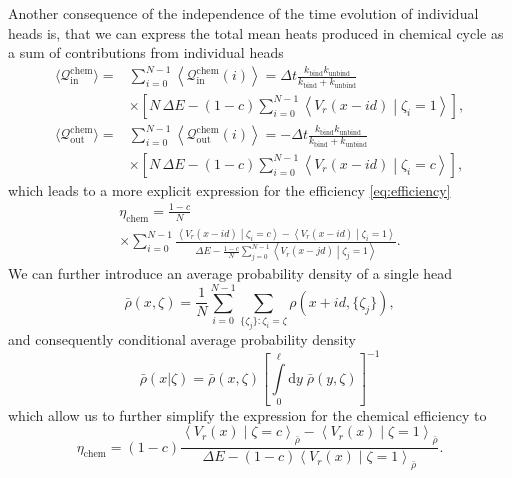 \documentclass[aps,pre,twocolumn,showpacs,showkeys,superscriptaddress,floatfix]{revtex4-1}
\newcommand{\rmd}{{\mathrm d}}
\begin{document}
Another consequence of the independence of the time evolution of individual heads is, 
that we can express the total mean heats produced in chemical cycle as a sum of contributions from individual heads
\begin{align*}
\langle \mathcal Q_\text{in}^\text{chem} \rangle 
=& \sum\limits_{i=0}^{N-1} \left\langle \mathcal Q_\text{in}^\text{chem}(i) \right\rangle 
= \Delta t \frac{ k_\text{bind} k_\text{unbind} }{ k_\text{bind} + k_\text{unbind} } 
\\ &\times
\left[ N \, \Delta E 
- (1-c) \sum\limits_{i=0}^{N-1} \left\langle V_r(x - i d ) \middle| \zeta_i = 1 \right\rangle 
\right] ,  
\\
\langle \mathcal Q^\text{chem}_\text{out} \rangle 
=& \sum\limits_{i=0}^{N-1} \left\langle \mathcal Q_\text{out}^\text{chem}(i) \right\rangle 
= - \Delta t \frac{ k_\text{bind} k_\text{unbind} }{ k_\text{bind} + k_\text{unbind} } 
\\ &\times
\left[ N \, \Delta E 
- (1-c) \sum\limits_{i=0}^{N-1} \left\langle V_r(x - i d ) \middle| \zeta_i = c \right\rangle  
\right] , 
\end{align*}
which leads to a more explicit expression for the efficiency \eqref{eq:efficiency} 
\begin{multline*}
\eta_\text{chem} = \frac{1-c}{N}
\\ \times
\sum\limits_{i=0}^{N-1} \frac{ \left\langle V_r(x-id) \middle| \zeta_i = c \right\rangle - \left\langle V_r( x -id ) \middle| \zeta_i = 1 \right\rangle }
{ \Delta E - \frac{1-c}{N} \sum\limits_{j=0}^{N-1} \left\langle V_r(x-jd) \middle| \zeta_j = 1 \right\rangle } 
. 
\end{multline*}
We can further introduce an average probability density of a single head 
\begin{equation}
\bar{\rho}(x,\zeta) = \frac{1}{N} \sum\limits_{i=0}^{N-1} \sum\limits_{ \{ \zeta_j \} : \zeta_i = \zeta } \rho( x + i d, \{ \zeta_j \} ) ,
\label{eq:eff_distribution}
\end{equation}
and consequently conditional average probability density
\begin{equation}
\bar{\rho}(x|\zeta) = \bar{\rho}(x,\zeta) \left[ \int\limits_0^\ell \rmd y \; \bar{\rho}(y,\zeta) \right]^{-1}
\label{eq:cond_prob}
\end{equation}
which allow us to further simplify the expression for the chemical efficiency to 
\begin{equation}
\eta_\text{chem} = (1-c)
\frac{ \left\langle V_r(x) \middle| \zeta = c \right\rangle_{\bar{\rho}} - \left\langle V_r(x) \middle| \zeta = 1 \right\rangle_{\bar{\rho}} }
{ \Delta E - (1-c) \left\langle V_r(x) \middle| \zeta = 1 \right\rangle_{\bar{\rho}} } 
. 
\label{eq:eta}
\end{equation}
\end{document}
